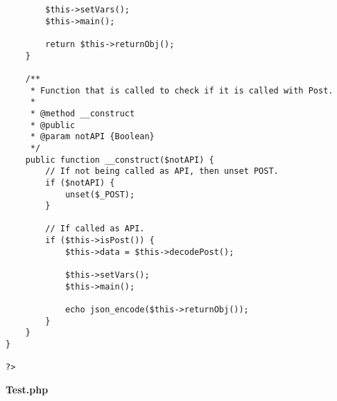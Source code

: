{\begin{lstlisting}
		$this->setVars();
		$this->main();

		return $this->returnObj();
	}

	/**
	 * Function that is called to check if it is called with Post.
	 *
	 * @method __construct
	 * @public
	 * @param notAPI {Boolean}
	 */
	public function __construct($notAPI) {
		// If not being called as API, then unset POST.
		if ($notAPI) {
			unset($_POST);
		}

		// If called as API.
		if ($this->isPost()) {
			$this->data = $this->decodePost();

			$this->setVars();
			$this->main();

			echo json_encode($this->returnObj());
		}
	}
}

?>
\end{lstlisting}
}
\textbf{Test.php}\label{Test.php}

